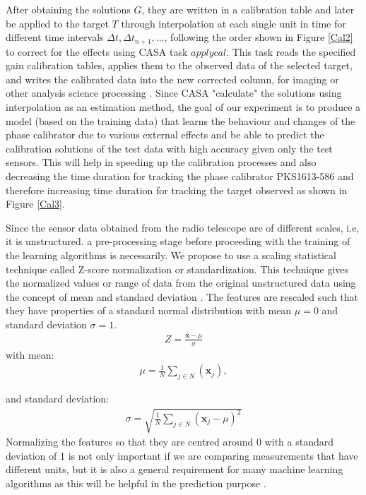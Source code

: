 After obtaining the solutions $G$, they are written in a calibration table and later be applied to the target $T$ through interpolation at each single unit in time for different time intervals $\Delta t, \Delta t_{n+1},\dots$, following the order shown in Figure \ref{Cal2} to correct for the effects using CASA task $\textit{applycal}$. This task reads the specified gain calibration tables, applies them to the observed data of the selected target, and writes the calibrated data into the new corrected column, for imaging or other analysis science processing \citep{ott2013casa}. Since CASA "calculate" the solutions using interpolation as an estimation method, the goal of our experiment is to produce a model (based on the training data) that learns the behaviour and changes of the phase calibrator due to various external effects and be able to predict the calibration solutions of the test data with high accuracy given only the test sensors. This will help in speeding up the calibration processes and also decreasing the time duration for tracking the phase calibrator PKS1613-586 and therefore increasing time duration for tracking the target observed as shown in Figure \ref{Cal3}. 

Since the sensor data obtained from the radio telescope are of different scales, i.e, it is unstructured. a pre-processing stage before proceeding with the training of the learning algorithms is necessarily. We propose to use a scaling statistical technique called Z-score normalization or standardization. This technique gives the normalized values or range of data from the original unstructured data using the concept of mean and standard deviation \citep{patro2015normalization}. The features are rescaled such that they have properties of a standard normal distribution with mean $\mu=0$ and standard deviation $\sigma=1$. 
\begin{align}
Z=\frac{\textbf{x}- \mu}{\sigma}
\end{align}
with mean:
\begin{align*}
\mu= \frac{1}{N} \sum_{j\in N} (\textbf{x}_j),
\end{align*}

and standard deviation:
\begin{align*}
\sigma=\sqrt{ \frac{1}{N} \sum_{j\in N} (\textbf{x}_j-\mu )^2}
\end{align*}
Normalizing the features so that they are centred around 0 with a standard deviation of 1 is not only important if we are comparing measurements that have different units, but it is also a general requirement for many machine learning algorithms as this will be helpful in the prediction purpose \citep{bott2014feature}.

